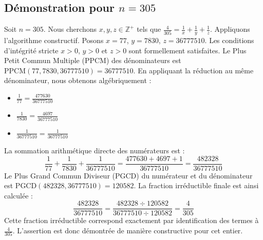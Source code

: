 \documentclass[11pt,a4paper]{article}
\begin{document}
\subsection{Démonstration pour $n = 305$}
Soit $n = 305$. Nous cherchons $x, y, z \in \mathbb{Z}^{+}$ tels que $\frac{4}{305} = \frac{1}{x} + \frac{1}{y} + \frac{1}{z}$.
Appliquons l'algorithme constructif. Posons $x = 77$, $y = 7830$, $z = 36777510$.
Les conditions d'intégrité stricte $x > 0$, $y > 0$ et $z > 0$ sont formellement satisfaites.
Le Plus Petit Commun Multiple (PPCM) des dénominateurs est $\text{PPCM}(77, 7830, 36777510) = 36777510$.
En appliquant la réduction au même dénominateur, nous obtenons algébriquement :
\begin{itemize}
    \item $\frac{1}{77} = \frac{477630}{36777510}$
    \item $\frac{1}{7830} = \frac{4697}{36777510}$
    \item $\frac{1}{36777510} = \frac{1}{36777510}$
\end{itemize}
La sommation arithmétique directe des numérateurs est :
$$ \frac{1}{77} + \frac{1}{7830} + \frac{1}{36777510} = \frac{477630 + 4697 + 1}{36777510} = \frac{482328}{36777510} $$
Le Plus Grand Commun Diviseur (PGCD) du numérateur et du dénominateur est $\text{PGCD}(482328, 36777510) = 120582$.
La fraction irréductible finale est ainsi calculée :
$$ \frac{482328}{36777510} = \frac{482328 \div 120582}{36777510 \div 120582} = \frac{4}{305} $$
Cette fraction irréductible correspond exactement par identification des termes à $\frac{4}{305}$. L'assertion est donc démontrée de manière constructive pour cet entier.
\end{document}
